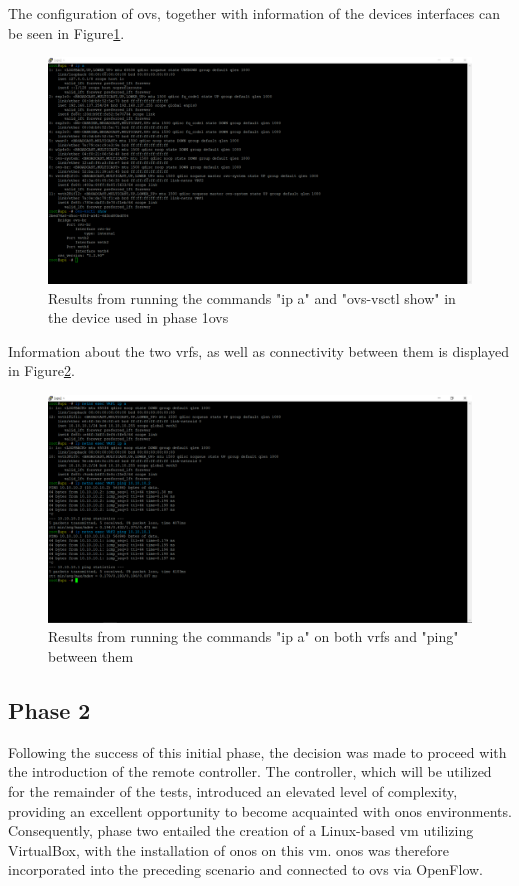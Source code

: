 The configuration of \gls{ovs}, together with information of the devices interfaces can be seen in Figure\ref{fig:exp1_phase1_ovsctl_show}.

\begin{figure}
	\centering
	\includegraphics[width=\textwidth]{Chapters/Figures/tests/ovs_phase_1/device_ports&ovs_config.PNG}
	\caption{Results from running the commands "ip a" and "ovs-vsctl show" in the device used in phase 1\gls{ovs}}
	\label{fig:exp1_phase1_ovsctl_show}
\end{figure}

Information about the two \glspl{vrf}, as well as connectivity between them is displayed in Figure\ref{fig:exp1_phase1_pings}.

\begin{figure}
	\centering
	\includegraphics[width=\textwidth]{Chapters/Figures/tests/ovs_phase_1/VRF_config_&_pings.PNG}
	\caption{Results from running the commands "ip a" on both \glspl{vrf} and "ping" between them}
	\label{fig:exp1_phase1_pings}
\end{figure}


\subsection{Phase 2}
Following the success of this initial phase, the decision was made to proceed with the introduction of the remote controller. The controller, which will be utilized for the remainder of the tests, introduced an elevated level of complexity, providing an excellent opportunity to become acquainted with \gls{onos} environments. Consequently, phase two entailed the creation of a Linux-based \gls{vm} utilizing VirtualBox, with the installation of \gls{onos} on this \gls{vm}. \gls{onos} was therefore incorporated into the preceding scenario and connected to \gls{ovs} via OpenFlow.

